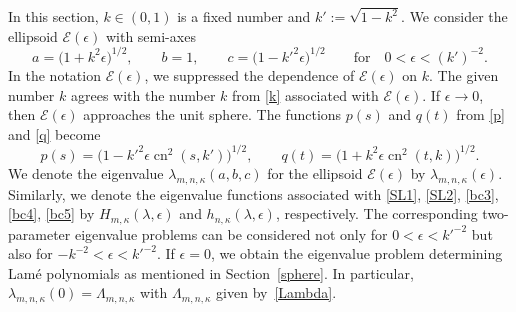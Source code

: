 \documentclass[10pt,a4paper]{amsart}
\newcommand{\E}{\mathcal{E}}
\DeclareMathOperator{\cn}{cn}
\numberwithin{equation}{section}
\begin{document}
In this section, $k\in(0,1)$ is a fixed number and $k':=\sqrt{1-k^2}$. We consider the ellipsoid $\E(\epsilon)$ with semi-axes
\[ a=\bigl(1+k^2\epsilon\bigr)^{1/2},\qquad b=1,\qquad c=\bigl(1-k'^2\epsilon\bigr)^{1/2}\qquad \text{for} \quad 0<\epsilon<(k')^{-2}.\]
In the notation $\E(\epsilon)$, we suppressed the dependence of $\E(\epsilon)$ on $k$.
The given number $k$ agrees with the number $k$ from \eqref{k} associated with $\E(\epsilon)$.
If $\epsilon\to 0$, then $\E(\epsilon)$ approaches the unit sphere.
The functions $p(s)$ and $q(t)$ from \eqref{p} and \eqref{q} become
\[ p(s)=\bigl(1-k'^2\epsilon \cn^2(s,k')\bigr)^{1/2},\qquad q(t)=\bigl(1+k^2\epsilon \cn^2(t,k)\bigr)^{1/2} .\]
We denote the eigenvalue $\lambda_{m,n,\kappa}(a,b,c)$ for the ellipsoid $\E(\epsilon)$ by $\lambda_{m,n,\kappa}(\epsilon)$. Similarly, we denote the eigenvalue functions associated with \eqref{SL1}, \eqref{SL2}, \eqref{bc3}, \eqref{bc4},
\eqref{bc5} by
$H_{m,\kappa}(\lambda,\epsilon)$ and $h_{n,\kappa}(\lambda,\epsilon)$, respectively.
The corresponding two-parameter eigenvalue problems can be considered not only for
$0<\epsilon<k'^{-2}$ but also for $-k^{-2}<\epsilon<k'^{-2}$. If $\epsilon=0$, we obtain the eigenvalue problem determining Lam\'e polynomials
as mentioned in Section~\ref{sphere}. In particular, $\lambda_{m,n,\kappa}(0)=\Lambda_{m,n,\kappa}$
with $\Lambda_{m,n,\kappa}$ given by~\eqref{Lambda}.
\end{document}
